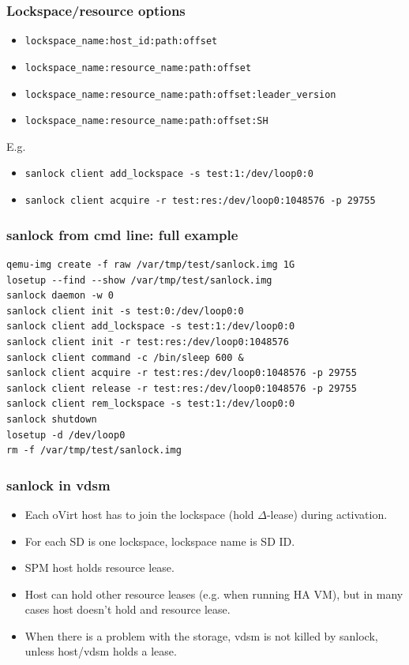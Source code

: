 \documentclass[10pt,utf8]{beamer}
\begin{document}
\begin{frame}
    \frametitle{Lockspace/resource options}
    \begin{itemize}
        \item \texttt{lockspace\_name:host\_id:path:offset}
        \item \texttt{lockspace\_name:resource\_name:path:offset}
        \item \texttt{lockspace\_name:resource\_name:path:offset:leader\_version}
        \item \texttt{lockspace\_name:resource\_name:path:offset:SH}
    \end{itemize}
    
    \vspace{0.5cm}
    
    E.g.
    \begin{itemize}
        \item \texttt{sanlock client add\_lockspace -s test:1:/dev/loop0:0}
        \item \texttt{sanlock client acquire -r test:res:/dev/loop0:1048576 -p 29755}
    \end{itemize}
\end{frame}

\begin{frame}[fragile]
    \frametitle{sanlock from cmd line: full example}
    \begin{lstlisting}[style=bash]
qemu-img create -f raw /var/tmp/test/sanlock.img 1G
losetup --find --show /var/tmp/test/sanlock.img
sanlock daemon -w 0
sanlock client init -s test:0:/dev/loop0:0
sanlock client add_lockspace -s test:1:/dev/loop0:0
sanlock client init -r test:res:/dev/loop0:1048576
sanlock client command -c /bin/sleep 600 &
sanlock client acquire -r test:res:/dev/loop0:1048576 -p 29755
sanlock client release -r test:res:/dev/loop0:1048576 -p 29755
sanlock client rem_lockspace -s test:1:/dev/loop0:0
sanlock shutdown
losetup -d /dev/loop0
rm -f /var/tmp/test/sanlock.img 
    \end{lstlisting}
\end{frame}

\begin{frame}
    \frametitle{sanlock in vdsm}
    \begin{itemize}
        \item Each oVirt host has to join the lockspace (hold $\Delta$-lease) during activation.
        \item For each SD is one lockspace, lockspace name is SD ID.
        \item SPM host holds resource lease.
        \item Host can hold other resource leases (e.g. when running HA VM), but in many cases host doesn't hold and resource lease.
        \item When there is a problem with the storage, vdsm is not killed by sanlock, unless host/vdsm holds a lease. %
    \end{itemize}
\end{frame}
\end{document}
